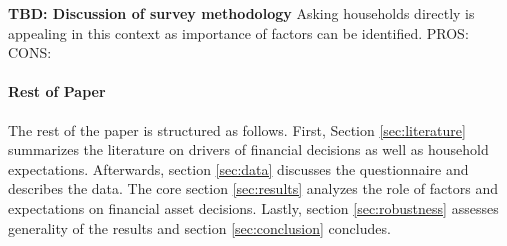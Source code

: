 \documentclass[ProjectABM]{subfiles}
\begin{document}
\textbf{TBD: Discussion of survey methodology}
Asking households directly is appealing in this context as importance of factors can be identified. 
PROS: 
CONS:



\paragraph{Rest of Paper}
The rest of the paper is structured as follows. First, Section \ref{sec:literature} summarizes the literature on drivers of financial decisions as well as household expectations. Afterwards, section \ref{sec:data} discusses the questionnaire and describes the data. The core section \ref{sec:results} analyzes the role of factors and expectations on financial asset decisions. Lastly, section \ref{sec:robustness} assesses generality of the results and section \ref{sec:conclusion} concludes.
\end{document}
